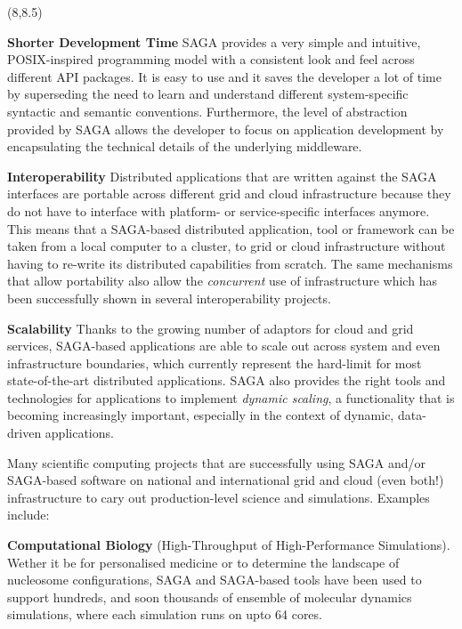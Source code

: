 \documentclass[a0b,portrait]{a0poster}
\def\LHead#1{\bigskip\bigskip\noindent{\huge\color{HeadColor} #1}\smallskip}
\begin{document}
\begin{textblock}{7}(8,8.5)

\LHead{Why Use SAGA?}
\large 

\textbf{\color{DarkBlue} Shorter Development Time} SAGA provides a very simple
and intuitive, POSIX-inspired programming model with a consistent look and
feel across different API packages. It is easy to use and it saves the
developer a lot of time by superseding the need to learn and understand
different system-specific syntactic and semantic conventions. Furthermore, the
level of abstraction provided by SAGA allows the developer to focus on
application development by encapsulating the technical details of the
underlying middleware.

\textbf{\color{DarkBlue} Interoperability} Distributed applications that are
written against the SAGA interfaces are portable across different grid and
cloud infrastructure because they do not have to interface with platform- or
service-specific interfaces anymore. This means that a SAGA-based distributed
application, tool or framework can be taken from a local computer to a
cluster, to grid or cloud infrastructure without having to re-write its
distributed capabilities from scratch. The same mechanisms that allow
portability also allow the \textit{concurrent} use of infrastructure which has
been successfully shown in several interoperability projects. 

\textbf{\color{DarkBlue} Scalability} Thanks to the growing number of adaptors
for cloud and grid services, SAGA-based applications are able to scale out
across system and even infrastructure boundaries, which currently represent
the hard-limit for most state-of-the-art distributed applications. SAGA also
provides the right tools and technologies for applications to implement 
\textit{dynamic scaling}, a functionality that is becoming increasingly 
important, especially in the context of dynamic, data-driven applications.

\large


\LHead{How SAGA is Used}
\large

Many scientific computing projects that are successfully using SAGA and/or
SAGA-based software on national and international grid and cloud (even both!)
infrastructure to cary out production-level science and simulations. Examples
include:

\textbf{\color{DarkBlue} Computational Biology } (High-Throughput of
High-Performance Simulations). Wether it be for personalised medicine or to
determine the landscape of nucleosome configurations, SAGA and SAGA-based
tools have been used to support hundreds, and soon thousands of ensemble of
molecular dynamics simulations, where each simulation runs on upto 64 cores.


\end{textblock}
\end{document}
